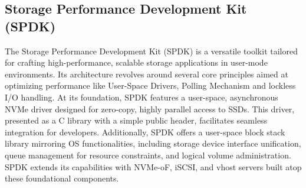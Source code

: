 \documentclass[nonacm,sigplan]{acmart}
\begin{document}
\subsection{Storage Performance Development Kit (SPDK)}
The Storage Performance Development Kit (SPDK) is a versatile toolkit tailored
for crafting high-performance, scalable storage applications in user-mode
environments. Its architecture revolves around several core principles aimed at
optimizing performance like User-Space Drivers, Polling Mechanism and lockless
I/O handling. At its foundation, SPDK features a user-space, asynchronous NVMe
driver designed for zero-copy, highly parallel access to SSDs. This driver,
presented as a C library with a simple public header, facilitates seamless
integration for developers. Additionally, SPDK offers a user-space block stack
library mirroring OS functionalities, including storage device interface
unification, queue management for resource constraints, and logical volume
administration. SPDK extends its capabilities with NVMe-oF, iSCSI, and vhost
servers built atop these foundational components. 
\end{document}
